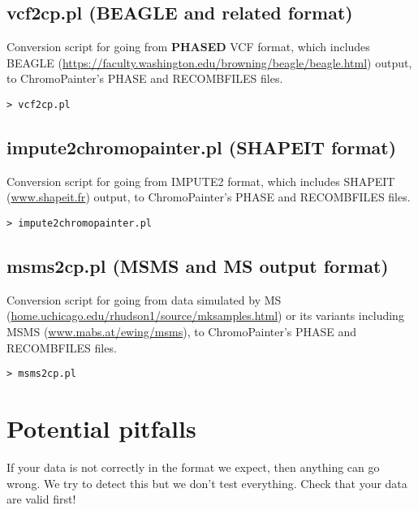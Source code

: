 \documentclass[11pt]{article}
\begin{document}
\subsection{vcf2cp.pl (BEAGLE and related format)}
Conversion script for going from {\bf PHASED} VCF format, which includes BEAGLE (\url{https://faculty.washington.edu/browning/beagle/beagle.html}) output, to ChromoPainter's PHASE and RECOMBFILES files.
\begin{lstlisting}[caption=vcf2cp]
> vcf2cp.pl
\end{lstlisting}


\subsection{impute2chromopainter.pl (SHAPEIT format)}
Conversion script for going from IMPUTE2 format, which includes SHAPEIT (\url{www.shapeit.fr}) output, to ChromoPainter's PHASE and RECOMBFILES files.
\begin{lstlisting}[caption=impute2chromopainter]
> impute2chromopainter.pl
\end{lstlisting}


\subsection{msms2cp.pl (MSMS and MS output format)}
Conversion script for going from data simulated by MS (\url{home.uchicago.edu/rhudson1/source/mksamples.html}) or its variants including MSMS (\url{www.mabs.at/ewing/msms}), to ChromoPainter's PHASE and RECOMBFILES files.
\begin{lstlisting}[caption=msms2cp]
> msms2cp.pl
\end{lstlisting}


\section{Potential pitfalls}
\label{sec:pitfalls}

If your data is not correctly in the format we expect, then anything can go wrong. We try to detect this but we don't test everything. Check that your data are valid first!
\end{document}
